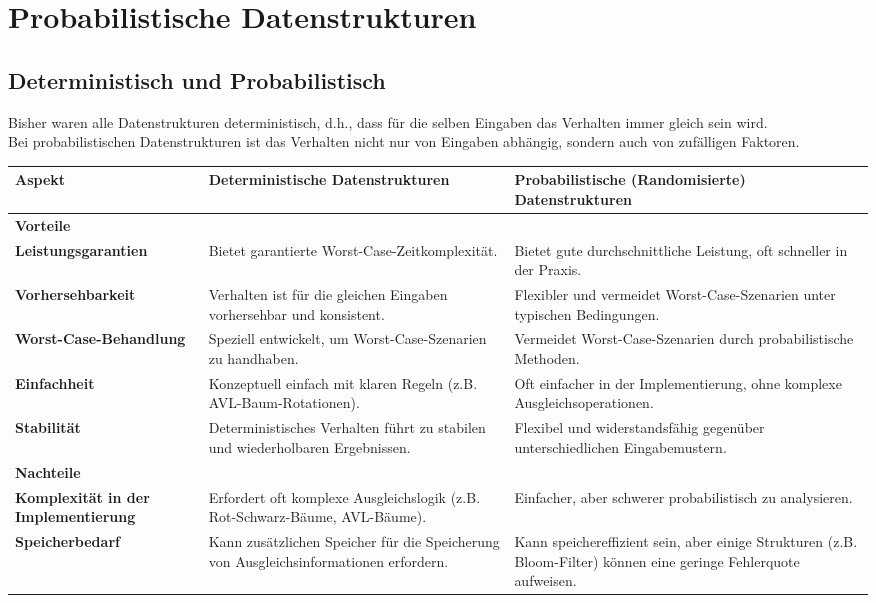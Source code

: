 \documentclass[
../../AuD-Zusammenfassung.tex,
]
{subfiles}
\begin{document}
\section{Probabilistische Datenstrukturen}
\subsection{Deterministisch und Probabilistisch}
Bisher waren alle Datenstrukturen deterministisch, d.h., dass für die selben Eingaben das Verhalten immer gleich sein wird.\\
Bei probabilistischen Datenstrukturen ist das Verhalten nicht nur von Eingaben abhängig, sondern auch von zufälligen Faktoren. 
\begin{longtable}{| p{4cm} | p{6cm} | p{6cm} |}
    \hline
    \rowcolor{backcolour}\textbf{Aspekt} & \textbf{Deterministische Datenstrukturen} & \textbf{Probabilistische (Randomisierte) Datenstrukturen} \\
    \hline
    \rowcolor{codegreen!30}\textbf{Vorteile} & & \\
    \hline
    \textbf{Leistungsgarantien} & Bietet garantierte Worst-Case-Zeitkomplexität. & Bietet gute durchschnittliche Leistung, oft schneller in der Praxis. \\
    \hline
    \textbf{Vorhersehbarkeit} & Verhalten ist für die gleichen Eingaben vorhersehbar und konsistent. & Flexibler und vermeidet Worst-Case-Szenarien unter typischen Bedingungen. \\
    \hline
    \textbf{Worst-Case-Behandlung} & Speziell entwickelt, um Worst-Case-Szenarien zu handhaben. & Vermeidet Worst-Case-Szenarien durch probabilistische Methoden. \\
    \hline
    \textbf{Einfachheit} & Konzeptuell einfach mit klaren Regeln (z.B. AVL-Baum-Rotationen). & Oft einfacher in der Implementierung, ohne komplexe Ausgleichsoperationen. \\
    \hline
    \textbf{Stabilität} & Deterministisches Verhalten führt zu stabilen und wiederholbaren Ergebnissen. & Flexibel und widerstandsfähig gegenüber unterschiedlichen Eingabemustern. \\
    \hline
    \rowcolor{magenta!30}\textbf{Nachteile} & & \\
    \hline
    \textbf{Komplexität in der Implementierung} & Erfordert oft komplexe Ausgleichslogik (z.B. Rot-Schwarz-Bäume, AVL-Bäume). & Einfacher, aber schwerer probabilistisch zu analysieren. \\
    \hline
    \textbf{Speicherbedarf} & Kann zusätzlichen Speicher für die Speicherung von Ausgleichsinformationen erfordern. & Kann speichereffizient sein, aber einige Strukturen (z.B. Bloom-Filter) können eine geringe Fehlerquote aufweisen. \\

\end{longtable}
\end{document}
